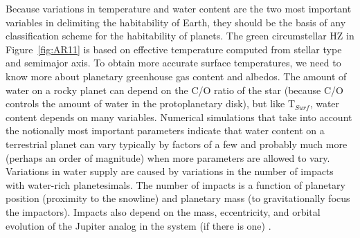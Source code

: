 Because variations in temperature and water content are the two most important variables in delimiting the habitability of Earth, they should be the basis of any classification scheme for the habitability of planets. The green circumstellar HZ in Figure~\ref{fig:AR11} is based on effective temperature computed from stellar type and semimajor axis. To obtain more accurate surface temperatures, we need to know more about planetary greenhouse gas content and albedos. The amount of water on a rocky planet can depend on the C/O ratio of the star (because C/O controls the amount of water in the protoplanetary disk), but like T$_{Surf}$, water content depends on many variables. Numerical simulations that take into account the notionally most important parameters indicate that water content on a terrestrial planet can vary typically by factors of a few \citep{Raymond2007} and probably much more (perhaps an order of magnitude) when more parameters are allowed to vary. Variations in water supply are caused by variations in the number of impacts with water-rich planetesimals. The number of impacts is a function of planetary position (proximity to the snowline) and planetary mass (to gravitationally focus the impactors). Impacts also depend on the mass, eccentricity, and orbital evolution of the Jupiter analog in the system (if there is one) \citep{Levison2003,OBrien2006}.

\begin{table}[tbh]
	\centering
	\caption{Planet classification according to water content}
		\label{tab:planetclassification}
\end{table}

